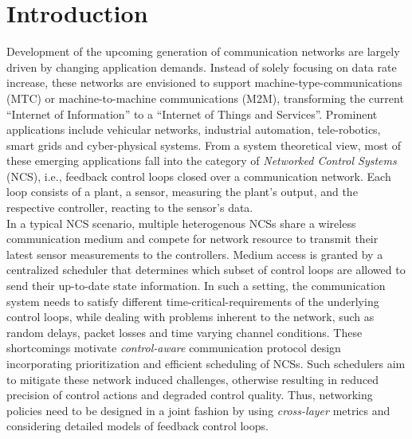 \chapter{Introduction}


Development of the upcoming generation of communication networks are largely
driven by changing application demands. Instead of solely focusing on data rate
increase, these networks are envisioned to support machine-type-communications
(MTC) or machine-to-machine communications (M2M), transforming the current
``Internet of Information'' to a ``Internet of Things and Services''. Prominent
applications include vehicular networks, industrial automation, tele-robotics,
smart grids and cyber-physical systems. \cite{murray2003future} From a system
theoretical view, most of these emerging applications fall into the category of
\textit{Networked Control Systems} (NCS), i.e., feedback control loops closed
over a communication network. Each loop consists of a plant, a sensor, measuring
the plant's output, and the respective controller, reacting to the sensor's
data. \\
In a typical NCS scenario, multiple heterogenous NCSs share a wireless
communication medium and compete for network resource to transmit their latest
sensor measurements to the controllers. Medium access is granted by a
centralized scheduler that determines which subset of control loops are allowed
to send their up-to-date state information. In such a setting, the communication
system needs to satisfy different time-critical-requirements of the underlying
control loops, while dealing with problems inherent to the network, such as
random delays, packet losses and time varying channel conditions. These
shortcomings motivate \textit{control-aware} communication protocol design
incorporating prioritization and efficient scheduling of NCSs. Such schedulers
aim to mitigate these network induced challenges, otherwise resulting in reduced
precision of control actions and degraded control quality. Thus, networking
policies need to be designed in a joint fashion by using \textit{cross-layer}
metrics and considering detailed models of feedback control loops. 


